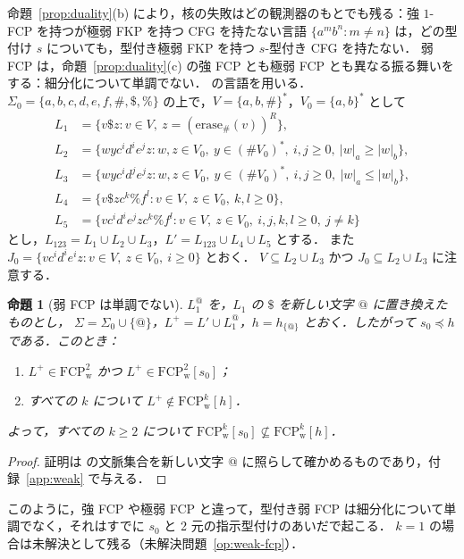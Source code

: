 \documentclass[11pt,a4paper]{ltjsarticle}
\numberwithin{equation}{section}
\theoremstyle{plain}
\newtheorem{proposition}[theorem]{命題}
\theoremstyle{definition}
\theoremstyle{remark}
\theoremstyle{plain}
\newcommand{\FCP}[2]{\mathrm{FCP}^{#1}_{\mathrm{#2}}}
\newcommand{\tFCP}[3]{\mathrm{FCP}^{#1}_{\mathrm{#2}}[#3]}
\begin{document}
命題~\ref{prop:duality}(b) により，核の失敗はどの観測器のもとでも残る：強 $1$-FCP を持つが極弱 FKP を持つ CFG を持たない言語
$\{a^mb^n:m\ne n\}$ \citep[Prop.~2(ii)]{ky2017} は，どの型付け $s$ についても，型付き極弱 FKP を持つ $s$-型付き CFG を持たない．
弱 FCP は，命題~\ref{prop:duality}(c) の強 FCP とも極弱 FCP とも異なる振る舞いをする：細分化について単調でない．
\citet[Secs.~5--6]{ky2017} の言語を用いる．$\Sigma_0=\{a,b,c,d,e,f,\#,\$,\%\}$ の上で，$V=\{a,b,\#\}^*$，$V_0=\{a,b\}^*$ として
\begin{align*}
L_1&=\{v\$z: v\in V,\ z=(\mathrm{erase}_\#(v))^R\},\\
L_2&=\{wyc^id^ie^jz: w,z\in V_0,\ y\in(\#V_0)^*,\ i,j\ge0,\ |w|_a\ge|w|_b\},\\
L_3&=\{wyc^id^je^jz: w,z\in V_0,\ y\in(\#V_0)^*,\ i,j\ge0,\ |w|_a\le|w|_b\},\\
L_4&=\{v\$zc^k\%f^l: v\in V,\ z\in V_0,\ k,l\ge0\},\\
L_5&=\{vc^id^ie^jzc^k\%f^l: v\in V,\ z\in V_0,\ i,j,k,l\ge0,\ j\ne k\}
\end{align*}
とし，$L_{123}=L_1\cup L_2\cup L_3$，$L'=L_{123}\cup L_4\cup L_5$ とする．
また $J_0=\{vc^id^ie^iz: v\in V,\ z\in V_0,\ i\ge0\}$ とおく．
$V\subseteq L_2\cup L_3$ かつ $J_0\subseteq L_2\cup L_3$ に注意する．

\begin{proposition}[弱 FCP は単調でない]\label{prop:weak-not-preserved}
$L_1^@$ を，$L_1$ の $\$$ を新しい文字 $@$ に置き換えたものとし，
$\Sigma=\Sigma_0\cup\{@\}$，$L^+=L'\cup L_1^@$，$h=h_{\{@\}}$ とおく．したがって $s_0\preceq h$ である．このとき：
\begin{enumerate}[label=\textup{(\alph*)},nosep]
\item $L^+\in\FCP2{w}$ かつ $L^+\in\tFCP2{w}{s_0}$；
\item すべての $k$ について $L^+\notin\tFCP{k}{w}{h}$．
\end{enumerate}
よって，すべての $k\ge2$ について $\tFCP{k}{w}{s_0}\not\subseteq\tFCP{k}{w}{h}$．
\end{proposition}
\begin{proof}
証明は \citet[Lemmas~8 and~12]{ky2017} の文脈集合を新しい文字 $@$ に照らして確かめるものであり，付録~\ref{app:weak} で与える．
\end{proof}

このように，強 FCP や極弱 FCP と違って，型付き弱 FCP は細分化について単調でなく，それはすでに $s_0$ と 2 元の指示型付けのあいだで起こる．
$k=1$ の場合は未解決として残る（未解決問題~\ref{op:weak-fcp}）．
\end{document}

